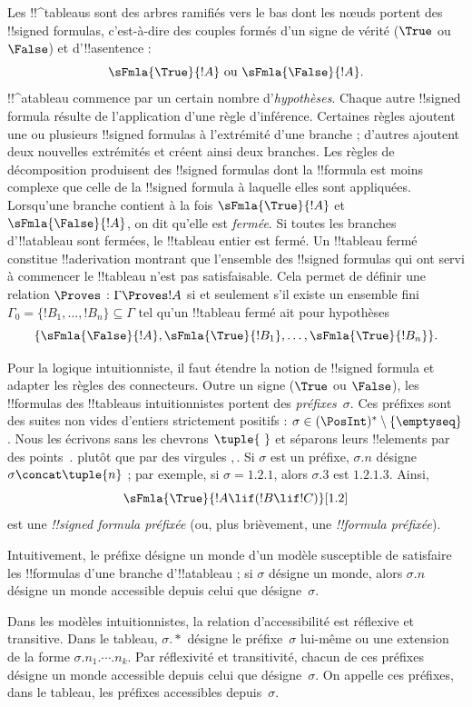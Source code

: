 \documentclass[../../../include/open-logic-section]{subfiles}
\begin{document}


Les !!^{tableau}s sont des arbres ramifiés vers le bas dont les nœuds
portent des !!{signed formula}s, c'est-à-dire des couples formés d'un
signe de vérité ($\True$ ou $\False$) et d'!!a{sentence} :
\[
\sFmla{\True}{!A} \text{ ou } \sFmla{\False}{!A}.
\]
!!^a{tableau} commence par un certain nombre d'\emph{hypothèses}.
Chaque autre !!{signed formula} résulte de l'application d'une règle
d'inférence. Certaines règles ajoutent une ou plusieurs !!{signed
formula}s à l'extrémité d'une branche ; d'autres ajoutent deux
nouvelles extrémités et créent ainsi deux branches. Les règles de
décomposition produisent des !!{signed formula}s dont la !!{formula}
est moins complexe que celle de la !!{signed formula} à laquelle elles
sont appliquées. Lorsqu'une branche contient à la fois
$\sFmla{\True}{!A}$ et $\sFmla{\False}{!A}$, on dit qu'elle est
\emph{fermée}. Si toutes les branches d'!!a{tableau} sont fermées,
le !!{tableau} entier est fermé. Un !!{tableau} fermé constitue
!!a{derivation} montrant que l'ensemble des !!{signed formula}s qui
ont servi à commencer le !!{tableau} n'est pas satisfaisable. Cela
permet de définir une relation $\Proves$ : $\Gamma \Proves !A$ si et
seulement s'il existe un ensemble fini~$\Gamma_0 = \{!B_1,
\dots, !B_n\} \subseteq \Gamma$ tel qu'un !!{tableau} fermé ait
pour hypothèses
\[
\{\sFmla{\False}{!A}, \sFmla{\True}{!B_1}, \dots, \sFmla{\True}{!B_n}\}.
\]

Pour la logique intuitionniste, il faut étendre la notion de
!!{signed formula} et adapter les règles des connecteurs. Outre un
signe ($\True$ ou $\False$), les !!{formula}s des !!{tableau}s
intuitionnistes portent des \emph{préfixes}~$\sigma$. Ces préfixes
sont des suites non vides d'entiers strictement positifs : $\sigma
\in (\PosInt)^* \setminus \{\emptyseq\}$. Nous les écrivons sans
les chevrons $\tuple{\ }$ et séparons leurs !!{element}s par des
points~$.$ plutôt que par des virgules $,$. Si $\sigma$ est un
préfixe, $\sigma.n$ désigne $\sigma \concat \tuple{n}$ ; par
exemple, si $\sigma = 1.2.1$, alors $\sigma.3$ est $1.2.1.3$.
Ainsi,
\[
\sFmla{\True}{!A \lif (!B \lif !C)}[1.2]
\]
est une \emph{!!{signed formula} préfixée} (ou, plus brièvement, une
\emph{!!{formula} préfixée}).

Intuitivement, le préfixe désigne un monde d'un modèle susceptible de
satisfaire les !!{formula}s d'une branche d'!!a{tableau} ; si
$\sigma$ désigne un monde, alors $\sigma.n$ désigne un monde
accessible depuis celui que désigne~$\sigma$.

Dans les modèles intuitionnistes, la relation d'accessibilité est
réflexive et transitive. Dans le tableau, $\sigma.*$ désigne
le préfixe~$\sigma$ lui-même ou une extension de la forme
$\sigma.n_1.\cdots.n_k$. Par réflexivité et transitivité, chacun
de ces préfixes désigne un monde accessible depuis celui que
désigne~$\sigma$. On appelle ces préfixes, dans le tableau,
les préfixes accessibles depuis~$\sigma$.
\end{document}
